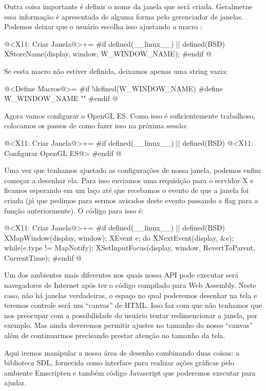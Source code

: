 Outra coisa importante é definir o nome da janela que será
criada. Geralmetne essa informação é apresentada de alguma forma pelo
gerenciador de janelas. Podemos deixar que o usuário escolha isso
ajustando a macro :

\iniciocodigo
@<X11: Criar Janela@>+=
#if defined(__linux__) || defined(BSD)
XStoreName(display, window, W_WINDOW_NAME);
#endif
@
\fimcodigo

Se essta macro não estiver definida, deixamos apenas uma string vazia:

@<Define Macros@>=
#if !defined(W_WINDOW_NAME)
#define W_WINDOW_NAME ""
#endif
@
\fimcodigo

Agora vamos configurar o OpenGL ES. Como isso é suficientemente
trabalhoso, colocamos os passos de como fazer isso na próxima sessão:

\iniciocodigo
@<X11: Criar Janela@>+=
#if defined(__linux__) || defined(BSD)
@<X11: Configurar OpenGL ES@>
#endif
@
\fimcodigo

Uma vez que tenhamos ajustado as configurações de nossa janela,
podemos enfim começar a desenhar ela. Para isso enviamos uma
requisição para o servidor X e ficamos esperando em um laço até que
recebamos o evento de que a janela foi criada (já que pedimos para
sermos avisados deste evento passando a
flag  para a
função  anteriormente). O código para isso é:

\iniciocodigo
@<X11: Criar Janela@>+=
#if defined(__linux__) || defined(BSD)
XMapWindow(display, window);
{
  XEvent e;
  do{
    XNextEvent(display, &e);
  } while(e.type != MapNotify);
}
XSetInputFocus(display, window, RevertToParent, CurrentTime);
#endif
@
\fimcodigo


Um dos ambientes mais diferentes nos quais nossa API pode executar
será navegadores de Internet após ter o código compilado para Web
Assembly. Neste caso, não há janelas verdadeiras, o espaço no qual
poderemos desenhar na tela e teremos controle será um ``canvas'' de
HTML. Isso faz com que não tenhamos que nos preocupar com a
possibilidade do usuário tentar redimencionar a janela, por
exemplo. Mas ainda deveremos permitir ajustes no tamanho do nosso
``canvas'' além de continuarmos precisando prestar atenção no tamanho
da tela.

Aqui iremos manipular a nossa área de desenho combinando duas coisas:
a biblioteca SDL, fornecida como interface para realizar ações
gráficas pelo ambiente Emscripten e também código Javascript que
poderemos executar para ajudar.

